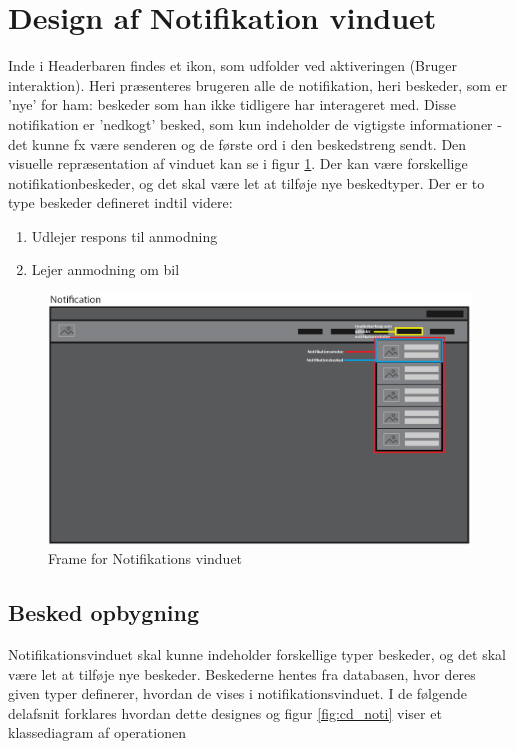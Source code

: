 \documentclass[SoftwareDesign/SoftwareDesign_main.tex]{subfiles}
\begin{document}
\section{Design af Notifikation vinduet}
Inde i Headerbaren findes et ikon, som udfolder ved aktiveringen (Bruger interaktion). Heri præsenteres brugeren alle de notifikation, heri beskeder, som er 'nye' for ham: beskeder som han ikke tidligere har interageret med. Disse notifikation er 'nedkogt' besked, som kun indeholder de vigtigste informationer - det kunne fx være senderen og de første ord i den beskedstreng sendt. Den visuelle repræsentation af vinduet kan se i figur \ref{fig:wire_noti}. Der kan være forskellige notifikationbeskeder, og det skal være let at tilføje nye beskedtyper. Der er to type beskeder defineret indtil videre: 
\begin{enumerate}
    \item Udlejer respons til anmodning
    \item Lejer anmodning om bil
\end{enumerate}
\begin{figure}[H]
    \centering
    \includegraphics[width=\textwidth]{SoftwareDesign/MVVMDesigns/Graphics/noti_wirefame.png}
    \caption{Frame for Notifikations vinduet}
    \label{fig:wire_noti}
\end{figure}

\subsection{Besked opbygning}
Notifikationsvinduet skal kunne indeholder forskellige typer beskeder, og det skal være let at tilføje nye beskeder. Beskederne hentes fra databasen, hvor deres given typer definerer, hvordan de vises i notifikationsvinduet. I de følgende delafsnit forklares hvordan dette designes og figur \ref{fig:cd_noti} viser et klassediagram af operationen
\end{document}
